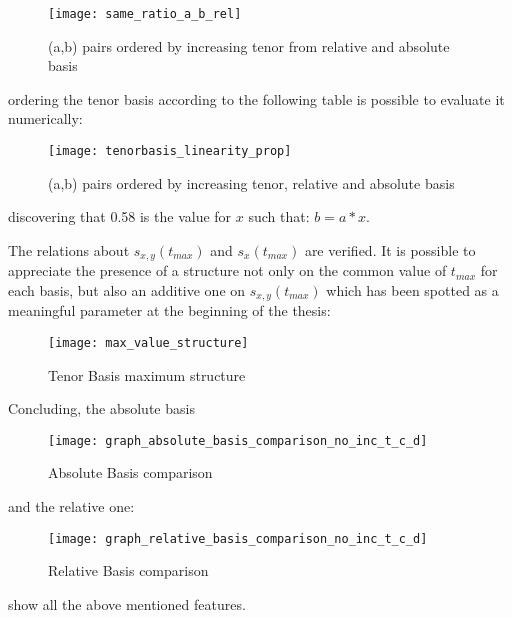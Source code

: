 \begin{figure}[H]
\centering
\texttt{[image: same\_ratio\_a\_b\_rel]}
\caption{(a,b) pairs ordered by increasing tenor from relative and absolute basis}
\label{fig:same_ratio_a_b_rel}
\end{figure}

ordering the tenor basis according to the following table is possible to evaluate it numerically:

\begin{figure}[H]
\centering
\texttt{[image: tenorbasis\_linearity\_prop]}
\caption{(a,b) pairs ordered by increasing tenor, relative and absolute basis}
\label{fig:tenorbasis_linearity_prop}
\end{figure}

discovering that 0.58 is the value for $x$ such that: $b=a*x$.


The relations about $s_{x,y}(t_{max})$ and $s_{x}(t_{max})$ are verified. It is possible to appreciate the presence of a structure not only on the common value of $t_{max}$ for each basis, but also an additive one on $s_{x,y}(t_{max})$ which has been spotted as a meaningful parameter at the beginning of the thesis:

\begin{figure}[H]
\centering
\texttt{[image: max\_value\_structure]}
\caption{Tenor Basis maximum structure}
\label{fig:max_value_structure}
\end{figure}




Concluding, the absolute basis 

\begin{figure}[H]
\centering
\texttt{[image: graph\_absolute\_basis\_comparison\_no\_inc\_t\_c\_d]}
\caption{Absolute Basis comparison}
\label{fig:graph_basis_comparison_no_inc_t_c_d}
\end{figure}

and the relative one:

\begin{figure}[H]
\centering
\texttt{[image: graph\_relative\_basis\_comparison\_no\_inc\_t\_c\_d]}
\caption{Relative Basis comparison}
\label{fig:graph_relative_basis_comparison_no_inc_t_c_d}
\end{figure}

show all the above mentioned features.
